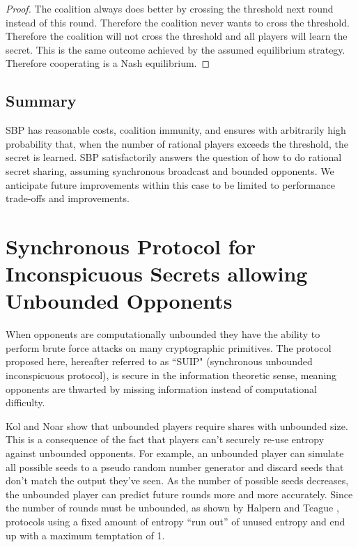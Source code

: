 \documentclass{dalcsthesis}
\begin{document}
\begin{proof}
The coalition always does better by crossing the threshold next round instead of this round. Therefore the coalition never wants to cross the threshold. Therefore the coalition will not cross the threshold and all players will learn the secret. This is the same outcome achieved by the assumed equilibrium strategy. Therefore cooperating is a Nash equilibrium.
\end{proof}


\subsection{Summary}

SBP has reasonable costs, coalition immunity, and ensures with arbitrarily high probability that, when the number of rational players exceeds the threshold, the secret is learned. SBP satisfactorily answers the question of how to do rational secret sharing, assuming synchronous broadcast and bounded opponents. We anticipate future improvements within this case to be limited to performance trade-offs and improvements.



\section{Synchronous Protocol for Inconspicuous Secrets allowing Unbounded Opponents}

When opponents are computationally unbounded they have the ability to perform brute force attacks on many cryptographic primitives. The protocol proposed here, hereafter referred to as ``SUIP" (synchronous unbounded inconspicuous protocol), is secure in the information theoretic sense, meaning opponents are thwarted by missing information instead of computational difficulty.

Kol and Noar \cite{kol08} show that unbounded players require shares with unbounded size. This is a consequence of the fact that players can't securely re-use entropy against unbounded opponents. For example, an unbounded player can simulate all possible seeds to a pseudo random number generator and discard seeds that don't match the output they've seen. As the number of possible seeds decreases, the unbounded player can predict future rounds more and more accurately. Since the number of rounds must be unbounded, as shown by Halpern and Teague \cite{halpern04}, protocols using a fixed amount of entropy ``run out'' of unused entropy and end up with a maximum temptation of 1.
\end{document}
